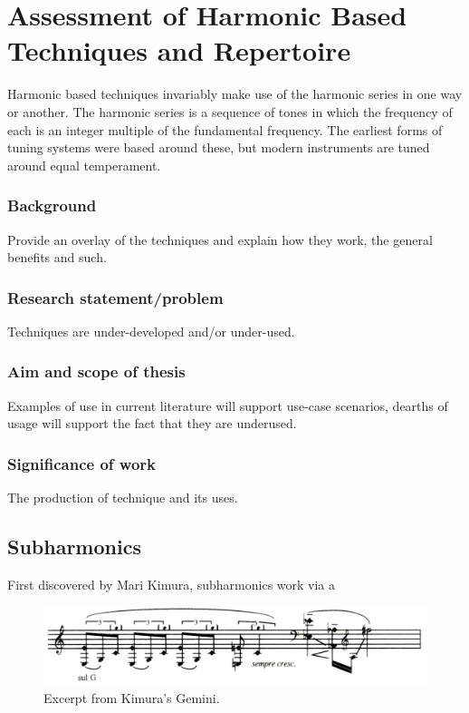 
\chapter{Assessment of Harmonic Based Techniques and Repertoire}

Harmonic based techniques invariably make use of the harmonic series in one way or another. The harmonic series is a sequence of tones in which the frequency of each is an integer multiple of the fundamental frequency. The earliest forms of tuning systems were based around these, but modern instruments are tuned around equal temperament.

\subsection{Background}
Provide an overlay of the techniques and explain how they work, the general benefits and such.
\subsection{Research statement/problem}
Techniques are under-developed and/or under-used.

\subsection{Aim and scope of thesis}
Examples of use in current literature will support use-case scenarios, dearths of usage will support the fact that they are underused.

\subsection{Significance of work}
The production of technique and its uses.

\section{Subharmonics}
First discovered by Mari Kimura, subharmonics work via a  \lipsum[3]\autocite{kimuraHowProduceSubharmonics1999} 
\begin{figure}
    \includegraphics[width=\linewidth]{./resources/kimura_gemini.png}
    \caption{Excerpt from Kimura's Gemini.}
    \label{fig:boat1}
  \end{figure}

